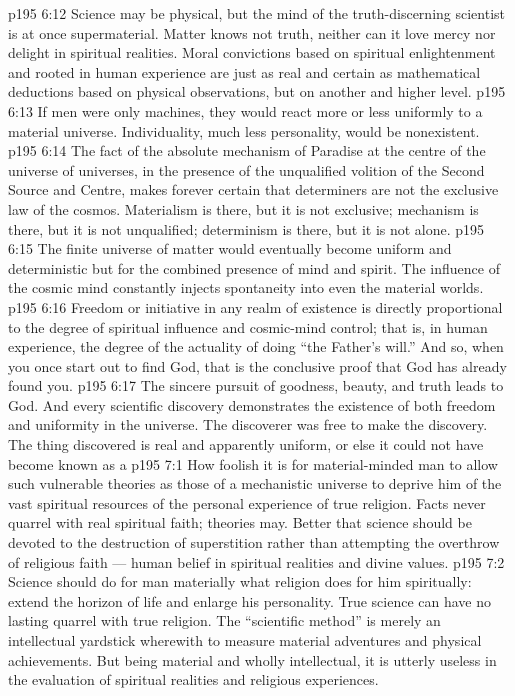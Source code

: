 \vs p195 6:12 Science may be physical, but the mind of the truth\hyp{}discerning scientist is at once supermaterial. Matter knows not truth, neither can it love mercy nor delight in spiritual realities. Moral convictions based on spiritual enlightenment and rooted in human experience are just as real and certain as mathematical deductions based on physical observations, but on another and higher level.
\vs p195 6:13 If men were only machines, they would react more or less uniformly to a material universe. Individuality, much less personality, would be nonexistent.
\vs p195 6:14 \pc The fact of the absolute mechanism of Paradise at the centre of the universe of universes, in the presence of the unqualified volition of the Second Source and Centre, makes forever certain that determiners are not the exclusive law of the cosmos. Materialism is there, but it is not exclusive; mechanism is there, but it is not unqualified; determinism is there, but it is not alone.
\vs p195 6:15 The finite universe of matter would eventually become uniform and deterministic but for the combined presence of mind and spirit. The influence of the cosmic mind constantly injects spontaneity into even the material worlds.
\vs p195 6:16 Freedom or initiative in any realm of existence is directly proportional to the degree of spiritual influence and cosmic\hyp{}mind control; that is, in human experience, the degree of the actuality of doing “the Father’s will.” And so, when you once start out to find God, that is the conclusive proof that God has already found you.
\vs p195 6:17 The sincere pursuit of goodness, beauty, and truth leads to God. And every scientific discovery demonstrates the existence of both freedom and uniformity in the universe. The discoverer was free to make the discovery. The thing discovered is real and apparently uniform, or else it could not have become known as a 
\vs p195 7:1 How foolish it is for material\hyp{}minded man to allow such vulnerable theories as those of a mechanistic universe to deprive him of the vast spiritual resources of the personal experience of true religion. Facts never quarrel with real spiritual faith; theories may. Better that science should be devoted to the destruction of superstition rather than attempting the overthrow of religious faith --- human belief in spiritual realities and divine values.
\vs p195 7:2 Science should do for man materially what religion does for him spiritually: extend the horizon of life and enlarge his personality. True science can have no lasting quarrel with true religion. The “scientific method” is merely an intellectual yardstick wherewith to measure material adventures and physical achievements. But being material and wholly intellectual, it is utterly useless in the evaluation of spiritual realities and religious experiences.
